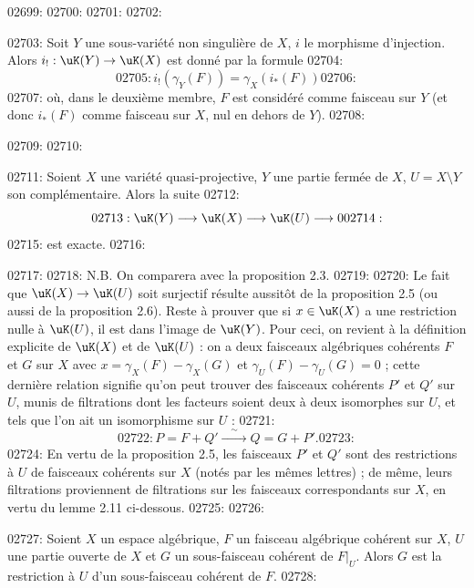 02699: 
02700: %
02701: 
02702: \begin{proposition}\label{prop:2.8}
02703: Soit $Y$ une sous-vari\'et\'e non singuli\`ere de $X$, $i$ le morphisme d'injection. Alors $i_! : \uK(Y) \to \uK(X)$ est donn\'e par la formule
02704: \begin{equation}\label{eq:2.19}
02705: i_!(\gamma_Y(F)) = \gamma_X(i_*(F))
02706: \end{equation}
02707: o\`u, dans le deuxi\`eme membre, $F$ est consid\'er\'e comme faisceau sur $Y$ (et donc $i_*(F)$ comme faisceau sur $X$, nul en dehors de $Y$).
02708: \end{proposition}
02709: 
02710: \begin{proposition}\label{prop:2.9}
02711: Soient $X$ une vari\'et\'e quasi-projective, $Y$ une partie ferm\'ee de $X$, $U = X \setminus Y$ son compl\'ementaire. Alors la suite
02712: \begin{equation}\label{eq:2.30}
02713: \uK(Y) \longrightarrow \uK(X) \longrightarrow \uK(U) \longrightarrow 0
02714: \end{equation}
02715: est exacte.
02716: \end{proposition}
02717: 
02718: N.B. On comparera avec la proposition 2.3.
02719: 
02720: Le fait que $\uK(X) \to \uK(U)$ soit surjectif r\'esulte aussit\^ot de la proposition 2.5 (ou aussi de la proposition 2.6). Reste \`a prouver que si $x \in \uK(X)$ a une restriction nulle \`a $\uK(U)$, il est dans l'image de $\uK(Y)$. Pour ceci, on revient \`a la d\'efinition explicite de $\uK(X)$ et de $\uK(U)$ : on a deux faisceaux alg\'ebriques coh\'erents $F$ et $G$ sur $X$ avec $x = \gamma_X(F) - \gamma_X(G)$ et $\gamma_U(F) - \gamma_U(G) = 0$ ; cette derni\`ere relation signifie qu'on peut trouver des faisceaux coh\'erents $P'$ et $Q'$ sur $U$, munis de filtrations dont les facteurs soient deux \`a deux isomorphes sur $U$, et tels que l'on ait un isomorphisme sur $U$ :
02721: \[
02722: P = F + Q' \xrightarrow{\quad\sim\quad} Q = G + P'.
02723: \]
02724: En vertu de la proposition 2.5, les faisceaux $P'$ et $Q'$ sont des restrictions \`a $U$ de faisceaux coh\'erents sur $X$ (not\'es par les m\^emes lettres) ; de m\^eme, leurs filtrations proviennent de filtrations sur les faisceaux correspondants sur $X$, en vertu du lemme 2.11 ci-dessous.
02725: 
02726: \begin{lemme}\label{lem:2.11}
02727: Soient $X$ un espace alg\'ebrique, $F$ un faisceau alg\'ebrique coh\'erent sur $X$, $U$ une partie ouverte de $X$ et $G$ un sous-faisceau coh\'erent de $F|_U$. Alors $G$ est la restriction \`a $U$ d'un sous-faisceau coh\'erent de $F$.
02728: \end{lemme}

